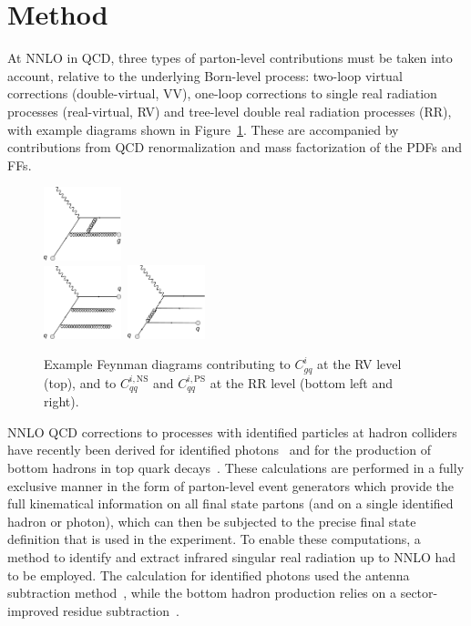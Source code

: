 \documentclass[10pt,aps,prl,twocolumn,preprintnumbers,nofootinbib]{revtex4-2}
\begin{document}
\section{Method}

At NNLO in QCD, three types of parton-level contributions must be taken into
account, relative to the underlying Born-level process: two-loop virtual
corrections (double-virtual, VV), one-loop corrections to single real radiation
processes (real-virtual, RV) and tree-level double real radiation processes
(RR), with example diagrams shown in Figure~\ref{fig:fdiag}. These are
accompanied by contributions from QCD renormalization and mass factorization of
the PDFs and FFs.

\begin{figure}[t]
  \includegraphics[width=0.2\textwidth]{qtog1l-crop.pdf}\\
  \includegraphics[width=0.2\textwidth]{qtoqNS-crop.pdf}\,
  \includegraphics[width=0.2\textwidth]{qtoqPS-crop.pdf}
  \caption{Example Feynman diagrams contributing to $C^i_{gq}$ at the RV level
    (top), and to $C^{i,\mathrm{NS}}_{qq}$ and $C^{i,\mathrm{PS}}_{qq}$ at the RR
    level (bottom left and right).}
  \label{fig:fdiag}
\end{figure}

NNLO QCD corrections to processes with identified particles at hadron colliders
have recently been derived for identified
photons~\cite{Gehrmann:2022cih,Chen:2022gpk} and for the production of bottom
hadrons in top quark decays~\cite{Czakon:2022pyz}. These calculations are
performed in a fully exclusive manner in the form of parton-level event
generators which provide the full kinematical information on all final state
partons (and on a single identified hadron or photon), which can then be
subjected to the precise final state definition that is used in the
experiment. To enable these computations, a method to identify and extract
infrared singular real radiation up to NNLO had to be employed. The calculation
for identified photons used the antenna subtraction
method~\cite{Gehrmann-DeRidder:2005btv,Daleo:2006xa,Currie:2013vh}, while the
bottom hadron production relies on a sector-improved residue
subtraction~\cite{Czakon:2010td}.
   
\end{document}
